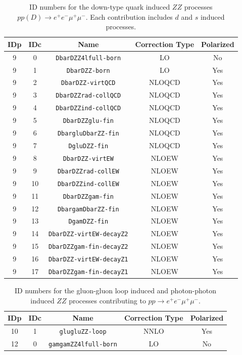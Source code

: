 \documentclass[english,12pt]{article}
\begin{document}
\begin{table}[th!]
\begin{center}
\begin{tabular}{|c|c|c|c|c|}\hline
IDp & IDc & Name & Correction Type & Polarized \\
\hline
9 & 0 & {\tt DbarDZZ4lfull-born} & LO & No\\
9 & 1 & {\tt DbarDZZ-born} & LO & Yes\\
9 & 2 & {\tt DbarDZZ-virtQCD} & NLOQCD & Yes\\
9 & 3 & {\tt DbarDZZrad-collQCD} & NLOQCD & Yes\\
9 & 4 & {\tt DbarDZZind-collQCD} & NLOQCD & Yes\\
9 & 5 & {\tt DbarDZZglu-fin} & NLOQCD & Yes\\
9 & 6 & {\tt DbargluDbarZZ-fin} & NLOQCD & Yes\\
9 & 7 & {\tt DgluDZZ-fin} & NLOQCD & Yes\\
9 & 8 & {\tt DbarDZZ-virtEW} & NLOEW & Yes\\
9 & 9 & {\tt DbarDZZrad-collEW} & NLOEW & Yes\\
9 & 10 & {\tt DbarDZZind-collEW} & NLOEW & Yes\\
9 & 11 & {\tt DbarDZZgam-fin} & NLOEW & Yes\\
9 & 12 & {\tt DbargamDbarZZ-fin} & NLOEW & Yes\\
9 & 13 & {\tt DgamDZZ-fin} & NLOEW & Yes\\
9 & 14 & {\tt DbarDZZ-virtEW-decayZ2} & NLOEW & Yes\\
9 & 15 & {\tt DbarDZZgam-fin-decayZ2} & NLOEW & Yes\\
9 & 16 & {\tt DbarDZZ-virtEW-decayZ1} & NLOEW & Yes\\
9 & 17 & {\tt DbarDZZgam-fin-decayZ1} & NLOEW & Yes\\
\hline
\end{tabular}
\caption{\small ID numbers for the down-type quark induced $ZZ$ processes $pp(D) \to e^+e^-\mu^+\mu^-$. 
Each contribution includes $d$ and $s$ induced processes.}
\label{tab:IDs_proc_cont_ZZ_D}
\end{center}
\end{table}

\begin{table}[th!]
\begin{center}
\begin{tabular}{|c|c|c|c|c|}\hline
IDp & IDc & Name & Correction Type & Polarized \\
\hline
10 & 1 & {\tt glugluZZ-loop} & NNLO & Yes\\
12 & 0 & {\tt gamgamZZ4lfull-born} & LO & No\\
\hline
\end{tabular}
\caption{\small ID numbers for the gluon-gluon loop induced and photon-photon induced $ZZ$ processes contributing to $pp \to e^+e^-\mu^+\mu^-$.}
\label{tab:IDs_proc_cont_ZZ_gg_aa}
\end{center}
\end{table}
\end{document}
